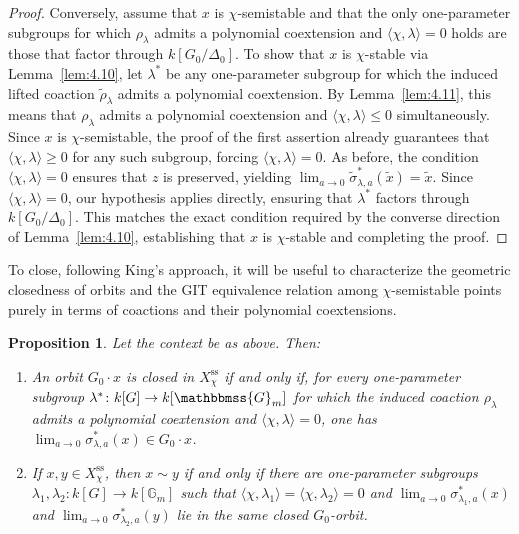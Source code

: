 \documentclass[11pt,a4paper,reqno,noamsfonts]{amsart}
\numberwithin{equation}{section}
\newtheorem{proposition}[theorem]{Proposition}
\theoremstyle{definition}
\theoremstyle{remark}
\newcommand{\GG}{\ensuremath{\mathbbmss{G}}}
\begin{document}
\begin{proof}
Conversely, assume that $x$ is $\chi$-semistable and that the only one-parameter subgroups for which $\rho_\lambda$ admits a polynomial coextension and $\langle \chi, \lambda \rangle = 0$ holds are those that factor through $k[G_0/\Delta_0]$. To show that $x$ is $\chi$-stable via Lemma~\ref{lem:4.10}, let $\lambda^*$ be any one-parameter subgroup for which the induced lifted coaction $\tilde{\rho}_\lambda$ admits a polynomial coextension. By Lemma~\ref{lem:4.11}, this means that $\rho_\lambda$ admits a polynomial coextension and $\langle \chi, \lambda \rangle \le 0$ simultaneously. Since $x$ is $\chi$-semistable, the proof of the first assertion already guarantees that $\langle \chi, \lambda \rangle \ge 0$ for any such subgroup, forcing $\langle \chi, \lambda \rangle = 0$. As before, the condition $\langle \chi, \lambda \rangle = 0$ ensures that $z$ is preserved, yielding $\displaystyle\lim_{a \to 0} \tilde{\sigma}_{\lambda,a}^*(\tilde{x}) = \tilde{x}$. Since $\langle \chi, \lambda \rangle = 0$, our hypothesis applies directly, ensuring that $\lambda^*$ factors through $k[G_0/\Delta_0]$. This matches the exact condition required by the converse direction of Lemma~\ref{lem:4.10}, establishing that $x$ is $\chi$-stable and completing the proof.
\end{proof}

To close, following King's approach, it will be useful to characterize the geometric closedness of orbits and the GIT equivalence relation among $\chi$-semistable points purely in terms of coactions and their polynomial coextensions.

\begin{proposition}
Let the context be as above. Then:
\begin{enumerate}
\item An orbit $G_0 \cdot x$ is closed in $X_{\chi}^{\mathrm{ss}}$ if and only if, for every one-parameter subgroup $\lambda^* \colon k[G] \to k[\GG_m]$ for which the induced coaction $\rho_{\lambda}$ admits a polynomial coextension and $\langle \chi,\lambda \rangle = 0$, one has $\displaystyle\lim_{a \to 0} \sigma_{\lambda,a}^* (x) \in G_0 \cdot x$.

\item If $x,y \in X_{\chi}^{\mathrm{ss}}$, then $x \sim y$ if and only if there are one-parameter subgroups $\lambda_1,\lambda_2 \colon k[G] \to k[\mathbb{G}_m]$ such that $\langle \chi,\lambda_1 \rangle = \langle \chi,\lambda_2 \rangle = 0$ and $\displaystyle\lim_{a \to 0} \sigma_{\lambda_1,a}^* (x)$ and $\displaystyle\lim_{a \to 0} \sigma_{\lambda_2,a}^* (y)$ lie in the same closed $G_0$-orbit.
\end{enumerate}
\end{proposition}
\end{document}
